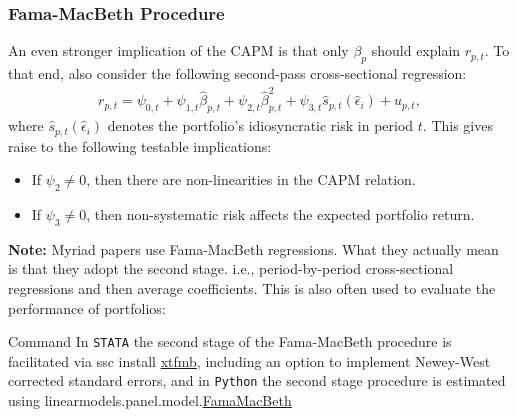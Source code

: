\documentclass[xcolor=dvipsnames, english, 8pt]{beamer}
\begin{document}
\begin{frame}
    \frametitle{Fama-MacBeth Procedure}

An even stronger implication of the CAPM is that only $\beta_p$ should explain $r_{p,t}$. To that end, \cite{FAMA1973} also consider the following second-pass cross-sectional regression:
\begin{align}
 r_{p,t} = \psi_{0,t} + \psi_{1,t}\hat{\beta}_{p,t} + \psi_{2,t}\hat{\beta}_{p,t}^2 + \psi_{3,t}\hat{s}_{p,t}(\hat{\epsilon}_i)+ u_{p,t},
\end{align}
where $\hat{s}_{p,t}(\hat{\epsilon}_i)$ denotes the portfolio's idiosyncratic risk in period $t$. This gives raise to the following testable implications:\vspace{0.25cm}\\
\begin{itemize}
    \item If $\psi_2 \neq 0$, then there are non-linearities in the CAPM relation.
    \item If $\psi_3 \neq 0$, then non-systematic risk affects the expected portfolio return.\vspace{0.5cm}\\
\end{itemize}


\textbf{Note:} Myriad papers use Fama-MacBeth regressions. What they actually mean is that they adopt the second stage. i.e., period-by-period cross-sectional regressions and then average coefficients. This is also often used to evaluate the performance of portfolios: \hyperlink{pfAnalysis}{}
\vfill
\begin{exampleblock}{{\small{Command}}}
In  \texttt{STATA} the second stage of the Fama-MacBeth procedure is facilitated via ssc install \href{http://fmwww.bc.edu/repec/bocode/x/xtfmb.html}{\color{Purple}xtfmb}, including an option to implement Newey-West corrected standard errors, and in \texttt{Python} the second stage procedure is estimated using linearmodels.panel.model.\href{https://bashtage.github.io/linearmodels/panel/panel/linearmodels.panel.model.FamaMacBeth.html\#linearmodels.panel.model.FamaMacBeth}{\color{Purple}FamaMacBeth}
\end{exampleblock}
\end{frame}

%
\end{document}
